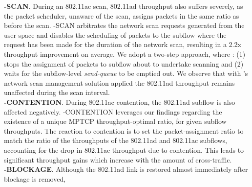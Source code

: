 \noindent\textbf{\name-SCAN}. During an 802.11ac scan, 802.11ad throughput also suffers severely, as the packet
scheduler, unaware of the scan, assigns packets in the same ratio as before the scan.
\name-SCAN
arbitrates the network scan requests generated
from the user space and disables the scheduling of packets to the
subflow where the request has been made for the duration of the
network scan, resulting in a 2.2x throughput improvement on average. 
We
adopt a two-step approach, where \name: (1) stops the assignment of
packets to subflow about to undertake scanning and (2) waits for the
subflow-level \emph{send-queue} to be emptied out. We observe that
with \name's network scan management solution applied 
the 802.11ad throughput remains unaffected during the scan interval. 
\fi
\\
\noindent\textbf{\name-CONTENTION}. During 802.11ac contention,
the 802.11ad subflow is also
affected negatively.
\name-CONTENTION leverages our findings regarding the 
existence of a unique MPTCP throughput-optimal ratio, for given
subflow throughputs. The reaction to contention is to set the
packet-assignment ratio to match the ratio of the throughputs of the
802.11ad and 802.11ac subflows, accounting for the drop in 802.11ac
throughput due to contention. This leads to significant throughput
gains which increase with the amount of cross-traffic.
\\
\noindent\textbf{\name-BLOCKAGE}. Although the 802.11ad link is restored 
almost immediately after blockage is removed, 
